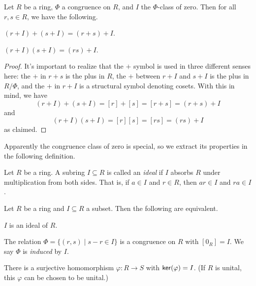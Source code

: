 \begin{prop}
Let \(R\) be a ring, \(\Phi\) a congruence on \(R\), and \(I\) the \(\Phi\)-class of zero.
Then for all \(r,s \in R\), we have the following.
\begin{proplist}
\item \((r+I)+(s+I) = (r+s)+I\).
\item \((r+I) (s+I) = (r s)+I\).
\end{proplist}
\end{prop}

\begin{proof}
It's important to realize that the \(+\) symbol is used in three different senses here: the \(+\) in \(r+s\) is the plus in \(R\), the \(+\) between \(r+I\) and \(s+I\) is the plus in \(R/\Phi\), and the \(+\) in \(r+I\) is a structural symbol denoting cosets.
With this in mind, we have \[ (r+I)+(s+I) = [r] + [s] = [r+s] = (r+s)+I \] and \[ (r+I)(s+I) = [r][s] = [rs] = (rs)+I \] as claimed.
\end{proof}

Apparently the congruence class of zero is special, so we extract its properties in the following definition.

\begin{dfn}[Ideal]
Let \(R\) be a ring.
A subring \(I \subseteq R\) is called an \emph{ideal} if \(I\) absorbs \(R\) under multiplication from both sides.
That is, if \(a \in I\) and \(r \in R\), then \(ar \in I\) and \(ra \in I\).
\end{dfn}

\begin{prop} \label{prop:ideal-conditions}
Let \(R\) be a ring and \(I \subseteq R\) a subset.
Then the following are equivalent.
\begin{proplist}
\item \label{prop:ideal-conditions:ideal} \(I\) is an ideal of \(R\).
\item \label{prop:ideal-conditions:congruence} The relation \(\Phi = \{ (r,s) \mid s-r \in I \}\) is a congruence on \(R\) with \([0_R] = I\).
We say \(\Phi\) is \emph{induced} by \(I\).
\item \label{prop:ideal-conditions:kernel} There is a surjective homomorphism \(\varphi : R \rightarrow S\) with \( \mathsf{ker}(\varphi)  = I\).
(If \(R\) is unital, this \(\varphi\) can be chosen to be unital.)
\end{proplist}
\end{prop}

